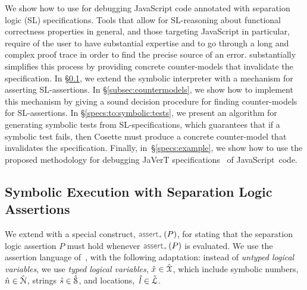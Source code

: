 
We show how to use \jilette for debugging JavaScript code annotated with 
separation logic (SL) specifications. Tools that allow for SL-reasoning about
functional correctness properties in general, and those targeting 
JavaScript in particular, require of the user to have substantial expertise 
and to go through a long and complex proof trace in order to find the precise 
source of an error. \jilette substantially simplifies this process by providing
concrete counter-models that invalidate the specification.
In \S\ref{subsec:sep:assertions}, we extend the 
 \jsil symbolic interpreter with a mechanism for asserting
SL-assertions. 
In \S\ref{subsec:countermodels}, we show how to implement this mechanism by giving a sound decision procedure for finding counter-models 
for SL-assertions.
In \S\ref{specs:to:symbolic:tests}, we present an algorithm  
for generating symbolic tests from SL-specifications, which guarantees 
that if a symbolic test fails, then Cosette must produce a concrete 
counter-model that invalidates 
the specification. Finally, in~\S\ref{specs:example}, we show how to use the 
proposed methodology for debugging JaVerT specifications~\cite{javert} of JavaScript~code. 

\subsection{\jsil Symbolic Execution with Separation Logic Assertions}
\label{subsec:sep:assertions}

We extend \jsil with a special construct, $\sepassert(P)$, for stating that 
the separation logic assertion $P$ must hold whenever $\sepassert(P)$ is evaluated. 
We use the assertion language of~\cite{javert}, with the following adaptation:
instead of \emph{untyped logical variables}, we 
use \emph{typed logical variables}, $\hat{x} \in \hat{\mathcal{X}}$, which include 
symbolic numbers, $\hat{n} \in \hat{\mathcal{N}}$, strings $\hat{s} \in \hat{\mathcal{S}}$, 
and locations,~$\hat{l} \in \hat{{\mathcal L}}$. 

